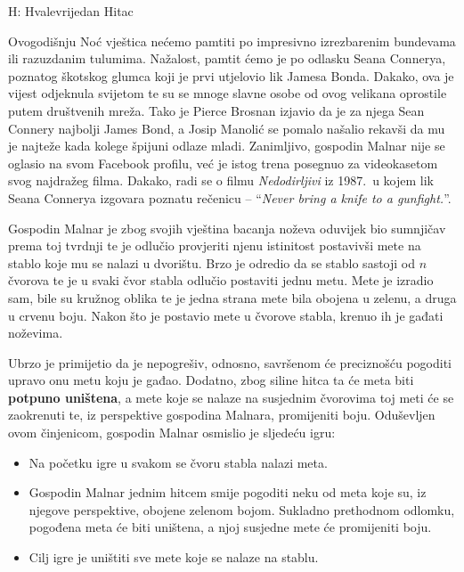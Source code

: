 \begin{statement}[
  timelimit=1 s,
  memorylimit=512 MiB,
]{H: Hvalevrijedan Hitac}

Ovogodišnju Noć vještica nećemo pamtiti po impresivno izrezbarenim bundevama
ili razuzdanim tulumima. Nažalost, pamtit ćemo je po odlasku Seana Connerya,
poznatog škotskog glumca koji je prvi utjelovio lik Jamesa Bonda.  Dakako,
ova je vijest odjeknula svijetom te su se mnoge slavne osobe od ovog velikana
oprostile putem društvenih mreža. Tako je Pierce Brosnan izjavio da je za
njega Sean Connery najbolji James Bond, a Josip Manolić se pomalo našalio
rekavši da mu je najteže kada kolege špijuni odlaze mladi.  Zanimljivo,
gospodin Malnar nije se oglasio na svom Facebook profilu, već je istog
trena posegnuo za videokasetom svog najdražeg filma. Dakako, radi se o filmu
\textit{Nedodirljivi} iz 1987.\ u kojem lik Seana Connerya izgovara poznatu
rečenicu -- ``\textit{Never bring a knife to a gunfight.}''.

Gospodin Malnar je zbog svojih vještina bacanja noževa oduvijek bio sumnjičav
prema toj tvrdnji te je odlučio provjeriti njenu istinitost postavivši
mete na stablo koje mu se nalazi u dvorištu. Brzo je odredio da se stablo
sastoji od $n$ čvorova te je u svaki čvor stabla odlučio postaviti jednu
metu. Mete je izradio sam, bile su kružnog oblika te je jedna strana mete bila
obojena u zelenu, a druga u crvenu boju. Nakon što je postavio mete u čvorove
stabla, krenuo ih je gađati noževima.

Ubrzo je primijetio da je nepogrešiv, odnosno, savršenom će preciznošću
pogoditi upravo onu metu koju je gađao. Dodatno, zbog siline hitca ta će meta
biti \textbf{potpuno uništena}, a mete koje se nalaze na susjednim čvorovima
toj meti će se zaokrenuti te, iz perspektive gospodina Malnara, promijeniti
boju. Oduševljen ovom činjenicom, gospodin Malnar osmislio je sljedeću igru:

\vspace{-2.5mm}
\begin{itemize}
    \item Na početku igre u svakom se čvoru stabla nalazi meta.
    \item Gospodin Malnar jednim hitcem smije pogoditi neku od meta koje su,
          iz njegove perspektive, obojene zelenom bojom. Sukladno prethodnom
          odlomku, pogođena meta će biti uništena, a njoj susjedne mete će
          promijeniti boju.
    \item Cilj igre je uništiti sve mete koje se nalaze na stablu.
\end{itemize}
\vspace{-2.5mm}


\end{statement}
